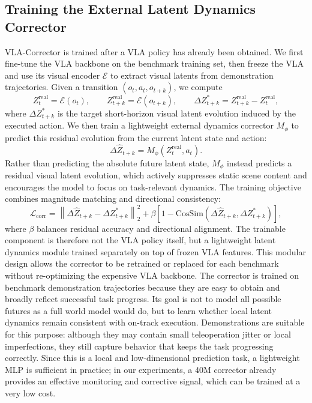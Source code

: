 \subsection{Training the External Latent Dynamics Corrector} VLA-Corrector is trained after a VLA policy has already been obtained. We first fine-tune the VLA backbone on the benchmark training set, then freeze the VLA and use its visual encoder $\mathcal{E}$ to extract visual latents from demonstration trajectories. Given a transition $(o_t,a_t,o_{t+k})$, we compute \begin{equation} Z_t^{\mathrm{real}}=\mathcal{E}(o_t), \qquad Z_{t+k}^{\mathrm{real}}=\mathcal{E}(o_{t+k}), \qquad \Delta Z_{t+k}^{*}=Z_{t+k}^{\mathrm{real}}-Z_t^{\mathrm{real}}, \label{eq:corrector_target} \end{equation} where $\Delta Z_{t+k}^{*}$ is the target short-horizon visual latent evolution induced by the executed action. We then train a lightweight external dynamics corrector $M_\phi$ to predict this residual evolution from the current latent state and action: \begin{equation} \Delta \hat{Z}_{t+k}=M_\phi(Z_t^{\mathrm{real}},a_t). \label{eq:corrector_prediction} \end{equation} Rather than predicting the absolute future latent state, $M_{\phi}$ instead predicts a residual visual latent evolution, which actively suppresses static scene content and encourages the model to focus on task-relevant dynamics. The training objective combines magnitude matching and directional consistency: \begin{equation} \mathcal{L}_{\mathrm{corr}} = \left\| \Delta \hat{Z}_{t+k}-\Delta Z_{t+k}^{*} \right\|_2^2 + \beta \left[ 1- \mathrm{CosSim} \left( \Delta \hat{Z}_{t+k}, \Delta Z_{t+k}^{*} \right) \right], \label{eq:corrector_loss} \end{equation} where $\beta$ balances residual accuracy and directional alignment. The trainable component is therefore not the VLA policy itself, but a lightweight latent dynamics module trained separately on top of frozen VLA features. This modular design allows the corrector to be retrained or replaced for each benchmark without re-optimizing the expensive VLA backbone. The corrector is trained on benchmark demonstration trajectories because they are easy to obtain and broadly reflect successful task progress. Its goal is not to model all possible futures as a full world model would do, but to learn whether local latent dynamics remain consistent with on-track execution. Demonstrations are suitable for this purpose: although they may contain small teleoperation jitter or local imperfections, they still capture behavior that keeps the task progressing correctly. Since this is a local and low-dimensional prediction task, a lightweight MLP is sufficient in practice; in our experiments, a 40M corrector already provides an effective monitoring and corrective signal, which can be trained at a very low cost.


